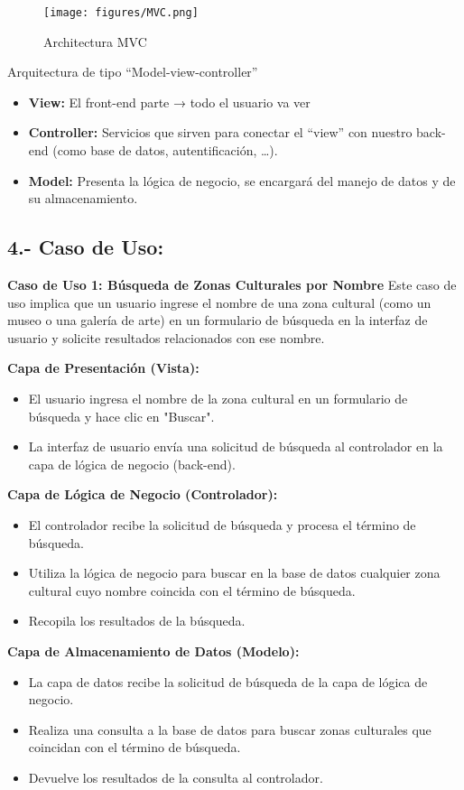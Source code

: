 \begin{figure}[!h]
	\texttt{[image: figures/MVC.png]}
	\caption{Architectura MVC}
	\label{fig:mvc}
\end{figure}

Arquitectura de tipo “Model-view-controller”
\begin{itemize}
	\item \textbf{View:} El front-end parte → todo el usuario va ver
	\item \textbf{Controller:} Servicios que sirven para conectar el “view” con nuestro back-end (como base de datos, autentificación, …).
	\item \textbf{Model:} Presenta la lógica de negocio, se encargará del manejo de datos y de su almacenamiento.
\end{itemize}

\subsection*{4.- Caso de Uso:}

\textbf{Caso de Uso 1: Búsqueda de Zonas Culturales por Nombre}
Este caso de uso implica que un usuario ingrese el nombre de una zona cultural (como un museo o una galería de arte) en un formulario de búsqueda en la interfaz de usuario y solicite resultados relacionados con ese nombre.

\textbf{Capa de Presentación (Vista):}
\begin{itemize}
	\item El usuario ingresa el nombre de la zona cultural en un formulario de búsqueda y hace clic en "Buscar".
	\item La interfaz de usuario envía una solicitud de búsqueda al controlador en la capa de lógica de negocio (back-end).
\end{itemize}

\textbf{Capa de Lógica de Negocio (Controlador):}
\begin{itemize}
	\item El controlador recibe la solicitud de búsqueda y procesa el término de búsqueda.
	\item Utiliza la lógica de negocio para buscar en la base de datos cualquier zona cultural cuyo nombre coincida con el término de búsqueda.
	\item Recopila los resultados de la búsqueda.
\end{itemize}

\textbf{Capa de Almacenamiento de Datos (Modelo):}
\begin{itemize}
	\item La capa de datos recibe la solicitud de búsqueda de la capa de lógica de negocio.
	\item Realiza una consulta a la base de datos para buscar zonas culturales que coincidan con el término de búsqueda.
	\item Devuelve los resultados de la consulta al controlador.
\end{itemize}

